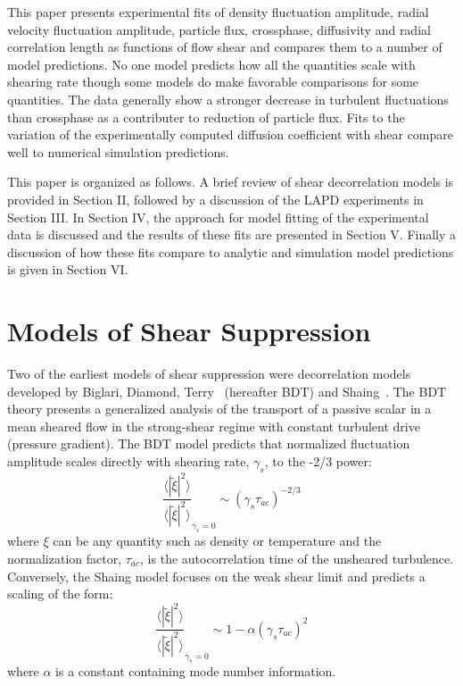 \documentclass[aip,pop,amsmath,amssymb,preprint,superscriptaddress]{revtex4-1} %
\begin{document}
This paper presents experimental fits of density fluctuation
amplitude, radial velocity fluctuation amplitude, particle flux,
crossphase, diffusivity and radial correlation length as functions of
flow shear and compares them to a number of model predictions. No one
model predicts how all the quantities scale with shearing rate though
some models do make favorable comparisons for some quantities.  The
data generally show a stronger decrease in turbulent fluctuations than
crossphase as a contributer to reduction of particle flux.  Fits to
the variation of the experimentally computed diffusion coefficient
with shear compare well to numerical simulation predictions. 

This paper is organized as follows.  A brief review of shear decorrelation models is provided in Section II, followed by a discussion of the LAPD experiments in Section III. In Section IV, the approach for model fitting of the experimental data is discussed and the results of these fits are presented in Section V. Finally a discussion of how these fits compare to analytic and simulation model predictions is given in Section VI.

\section{Models of Shear Suppression}

Two of the earliest models of shear suppression were decorrelation models developed by Biglari, Diamond, Terry~\cite{biglari90} (hereafter BDT) and Shaing~\cite{shaing90}. The BDT theory presents a generalized analysis of the transport of a passive scalar in a mean sheared flow in the strong-shear regime with constant turbulent drive (pressure gradient). The BDT model predicts that normalized fluctuation amplitude scales directly with shearing rate, $\gamma_{s}$, to the -2/3 power:
%
\begin{equation}
\frac{\langle |\tilde{\xi}|^{2} \rangle}{\langle |\tilde{\xi}|^{2} \rangle}_{\gamma_{s}=0} \sim (\gamma_{s}\tau_{ac})^{-2/3}
\label{eq:BDT_theory}
\end{equation}
%
where $\xi$ can be any quantity such as density or temperature and the normalization factor, $\tau_{ac}$, is the autocorrelation time of the unsheared turbulence. Conversely, the Shaing model focuses on the weak shear limit and predicts a scaling of the form:
%
\begin{equation}
\frac{\langle |\tilde{\xi}|^{2} \rangle}{\langle |\tilde{\xi}|^{2} \rangle}_{\gamma_{s}=0} \sim 1- \alpha(\gamma_{s}\tau_{ac})^2
\label{eq:shaing_theory}
\end{equation}
%
where $\alpha$ is a constant containing mode number information. 
\end{document}
